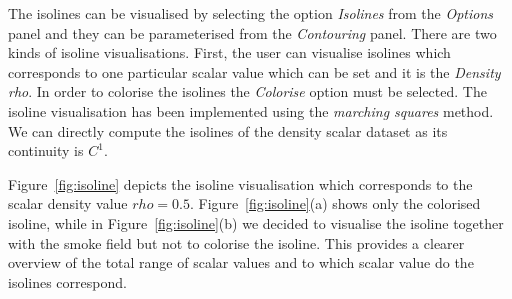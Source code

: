
The isolines can be visualised by selecting the option \emph{Isolines} from the \emph{Options} panel and they can be parameterised from the \emph{Contouring} panel. There are two kinds of isoline visualisations. First, the user can visualise isolines which corresponds to one particular scalar value which can be set and it is the \emph{Density rho}. In order to colorise the isolines the \emph{Colorise} option must be selected. The isoline visualisation has been implemented using the \emph{marching squares} method. We can directly compute the isolines of the density scalar dataset as its continuity is $C^1$. 


Figure~\ref{fig:isoline} depicts the isoline visualisation which corresponds to the scalar density value $rho = 0.5$. Figure~\ref{fig:isoline}(a) shows only the colorised isoline, while in Figure~\ref{fig:isoline}(b) we decided to visualise the isoline together with the smoke field but not to colorise the isoline. This provides a clearer overview of the total range of scalar values and to which scalar value do the isolines correspond.


